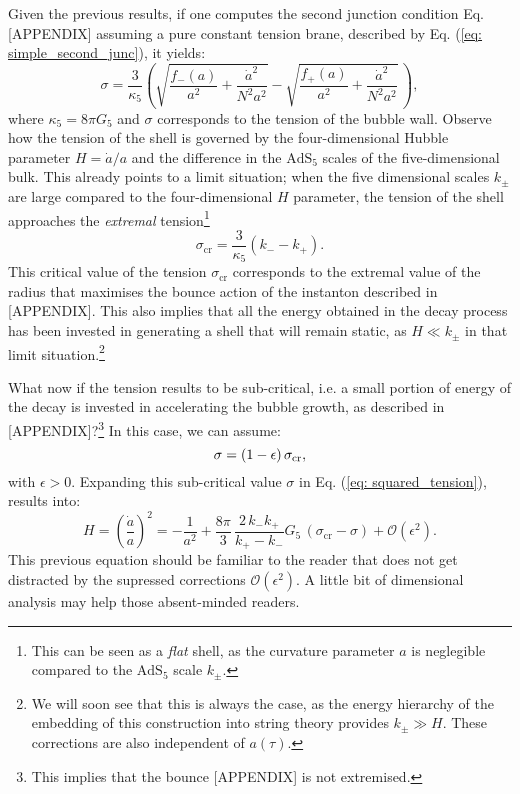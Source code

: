 Given the previous results, if one computes the second junction condition Eq. [APPENDIX] assuming a pure constant tension brane, described by Eq. (\ref{eq: simple_second_junc}), it yields:
\begin{equation}\label{eq: squared_tension}
	\sigma=\frac{3}{\kappa_5}\left(\sqrt{\frac{f_{-}(a)}{a^2}+\frac{\dot{a}^2}{N^2 a^2}}-\sqrt{\frac{f_{+}(a)}{a^2}+\frac{\dot{a}^2}{N^2 a^2}}\,\right),
\end{equation}
where $\kappa_{5} = 8 \pi G_{5}$ and $\sigma$ corresponds to the tension of the bubble wall. Observe how the tension of the shell is governed by the four-dimensional Hubble parameter $H = \dot{a}/a$ and the difference in the $\text{AdS}_{5}$ scales of the five-dimensional bulk. This already points to a limit situation; when the five dimensional scales $k_{\pm}$ are large compared to the four-dimensional $H$ parameter, the tension of the shell approaches the \textit{extremal} tension\footnote{This can be seen as a \textit{flat} shell, as the curvature parameter $a$ is neglegible compared to the $\text{AdS}_{5}$ scale $k_{\pm}$.}
\begin{equation}\label{eq: critical_tension}
	\sigma_{\text{cr}} = \frac{3}{\kappa_{5}} \left(k_{-} - k_{+} \right).
\end{equation}
This critical value of the tension $\sigma_{\text{cr}}$ corresponds to the extremal value of the radius that maximises the bounce action of the instanton described in [APPENDIX]. This also implies that all the energy obtained in the decay process has been invested in generating a shell that will remain static, as $H\ll k_{\pm}$ in that limit situation.\footnote{We will soon see that this is always the case, as the energy hierarchy of the embedding of this construction into string theory provides $k_{\pm} \gg H$. These corrections are also independent of $a(\tau)$.} 

What now if the tension results to be sub-critical, i.e. a small portion of energy of the decay is invested in accelerating the bubble growth, as described in [APPENDIX]?\footnote{This implies that the bounce [APPENDIX] is not extremised.} In this case, we can assume:
\begin{equation}
	\sigma = (1- \epsilon) \, \sigma_{\text{\text{cr}}},
\end{equation}
with $\epsilon > 0$. Expanding this sub-critical value $\sigma$ in Eq. (\ref{eq: squared_tension}), results into:
\begin{equation}\label{eq: friedmann_from_junc}
	H = \left(\frac{\dot{a}}{a}\right)^2=-\frac{1}{a^2}+\frac{8 \pi}{3} \, \frac{ 2 \, k_{-}k_{+}}{k_{+} - k_{-}} G_5\,\left(\sigma_{\text{cr}}-\sigma\right)+\mathcal{O}\left(\epsilon^2\right).
\end{equation}
This previous equation should be familiar to the reader that does not get distracted by the supressed corrections $\mathcal{O}\left(\epsilon^2\right)$. A little bit of dimensional analysis may help those absent-minded readers. 

